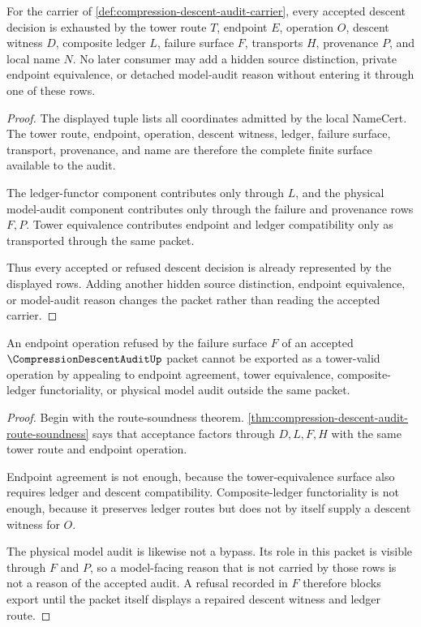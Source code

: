 \begin{theorem}
\label{thm:compression-descent-audit-ledger-exhaustion}
For the carrier of \autoref{def:compression-descent-audit-carrier}, every accepted descent decision is exhausted by the tower route $T$, endpoint $E$, operation $O$, descent witness $D$, composite ledger $L$, failure surface $F$, transports $H$, provenance $P$, and local name $N$. No later consumer may add a hidden source distinction, private endpoint equivalence, or detached model-audit reason without entering it through one of these rows.
\end{theorem}
\begin{proof}
The displayed tuple lists all coordinates admitted by the local NameCert. The tower route, endpoint, operation, descent witness, ledger, failure surface, transport, provenance, and name are therefore the complete finite surface available to the audit.

The ledger-functor component contributes only through $L$, and the physical model-audit component contributes only through the failure and provenance rows $F,P$. Tower equivalence contributes endpoint and ledger compatibility only as transported through the same packet.

Thus every accepted or refused descent decision is already represented by the displayed rows. Adding another hidden source distinction, endpoint equivalence, or model-audit reason changes the packet rather than reading the accepted carrier.
\end{proof}

\begin{theorem}
\label{thm:compression-descent-audit-nonescape}
An endpoint operation refused by the failure surface $F$ of an accepted $\CompressionDescentAuditUp$ packet cannot be exported as a tower-valid operation by appealing to endpoint agreement, tower equivalence, composite-ledger functoriality, or physical model audit outside the same packet.
\end{theorem}
\begin{proof}
Begin with the route-soundness theorem. \autoref{thm:compression-descent-audit-route-soundness} says that acceptance factors through $D,L,F,H$ with the same tower route and endpoint operation.

Endpoint agreement is not enough, because the tower-equivalence surface also requires ledger and descent compatibility. Composite-ledger functoriality is not enough, because it preserves ledger routes but does not by itself supply a descent witness for $O$.

The physical model audit is likewise not a bypass. Its role in this packet is visible through $F$ and $P$, so a model-facing reason that is not carried by those rows is not a reason of the accepted audit. A refusal recorded in $F$ therefore blocks export until the packet itself displays a repaired descent witness and ledger route.
\end{proof}

